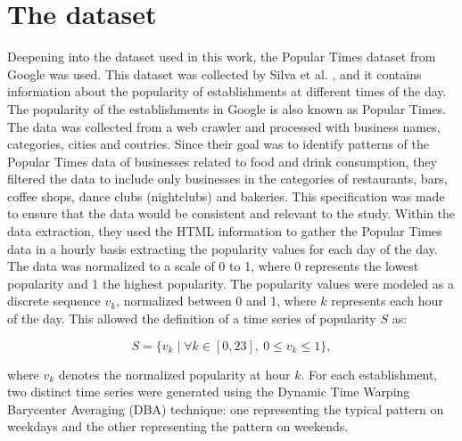 \documentclass{ieeeaccess}
\begin{document}


\section{The dataset} %
Deepening into the dataset used in this work, the Popular Times dataset from Google was used. This dataset was collected by Silva et al. \cite{silva2019signatures}, and it contains information about the popularity of establishments at different times of the day. The popularity of the establishments in Google is also known as Popular Times.
The data was collected from a web crawler and processed with business names, categories, cities and coutries. Since their goal was to identify patterns of the Popular Times data of businesses related to food and drink consumption, they filtered the data to include only businesses in the categories of restaurants, bars, coffee shops, dance clubs (nightclubs) and bakeries. 
This specification was made to ensure that the data would be consistent and relevant to the study.
Within the data extraction, they used the HTML information to gather the Popular Times data in a hourly basis extracting the popularity values for each day of the day. The data was normalized to a scale of 0 to 1, where 0 represents the lowest popularity and 1 the highest popularity. 
The popularity values were modeled as a discrete sequence $v_k$, normalized between 0 and 1, where $k$ represents each hour of the day. This allowed the definition of a time series of popularity $S$ as:

\[
S = \{ v_k \mid \forall k \in [0, 23], \ 0 \leq v_k \leq 1 \},
\]

where $v_k$ denotes the normalized popularity at hour $k$. For each establishment, two distinct time series were generated using the Dynamic Time Warping Barycenter Averaging (DBA) technique: one representing the typical pattern on weekdays and the other representing the pattern on weekends.
\end{document}
